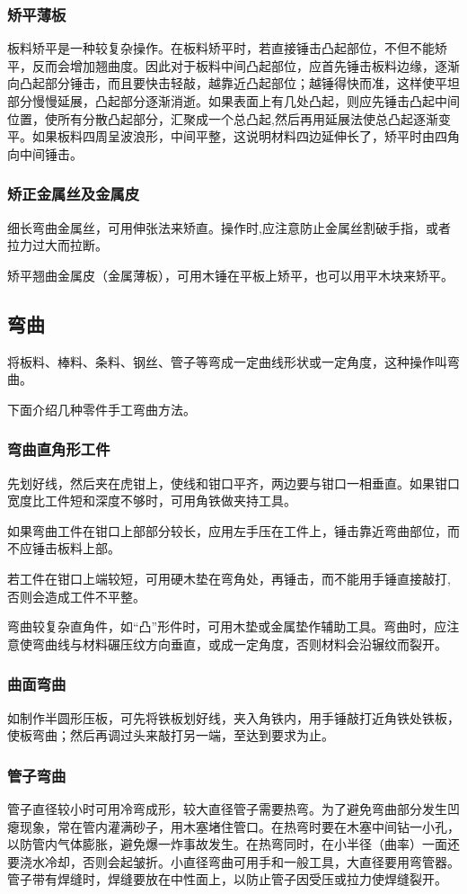 \documentclass{ctexbook}
\begin{document}
\subsubsection{矫平薄板}
板料矫平是一种较复杂操作。在板料矫平时，若直接锤击凸起部位，不但不能矫平，反而会增加翘曲度。因此对于板料中间凸起部位，应首先锤击板料边缘，逐渐向凸起部分锤击，而且要快击轻敲，越靠近凸起部位；越锤得快而准，这样使平坦部分慢慢延展，凸起部分逐渐消逝。如果表面上有几处凸起，则应先锤击凸起中间位置，使所有分散凸起部分，汇聚成一个总凸起,然后再用延展法使总凸起逐渐变平。如果板料四周呈波浪形，中间平整，这说明材料四边延伸长了，矫平时由四角向中间锤击。
\subsubsection{矫正金属丝及金属皮}
细长弯曲金属丝，可用伸张法来矫直。操作时,应注意防止金属丝割破手指，或者拉力过大而拉断。

矫平翘曲金属皮（金属薄板），可用木锤在平板上矫平，也可以用平木块来矫平。
\subsection{弯曲}
将板料、棒料、条料、钢丝、管子等弯成一定曲线形状或一定角度，这种操作叫弯曲。

下面介绍几种零件手工弯曲方法。
\subsubsection{弯曲直角形工件}
先划好线，然后夹在虎钳上，使线和钳口平齐，两边要与钳口一相垂直。如果钳口宽度比工件短和深度不够时，可用角铁做夹持工具。

如果弯曲工件在钳口上部部分较长，应用左手压在工件上，锤击靠近弯曲部位，而不应锤击板料上部。

若工件在钳口上端较短，可用硬木垫在弯角处，再锤击，而不能用手锤直接敲打,否则会造成工件不平整。

弯曲较复杂直角件，如“凸”形件时，可用木垫或金属垫作辅助工具。弯曲时，应注意使弯曲线与材料碾压纹方向垂直，或成一定角度，否则材料会沿辗纹而裂开。
\subsubsection{曲面弯曲}
如制作半圆形压板，可先将铁板划好线，夹入角铁内，用手锤敲打近角铁处铁板，使板弯曲；然后再调过头来敲打另一端，至达到要求为止。
\subsubsection{管子弯曲}
管子直径较小时可用冷弯成形，较大直径管子需要热弯。为了避免弯曲部分发生凹瘪现象，常在管内灌满砂子，用木塞堵住管口。在热弯时要在木塞中间钻一小孔，以防管内气体膨胀，避免爆一炸事故发生。在热弯同时，在小半径（曲率）一面还要浇水冷却，否则会起皱折。小直径弯曲可用手和一般工具，大直径要用弯管器。管子带有焊缝时，焊缝要放在中性面上，以防止管子因受压或拉力使焊缝裂开。
\end{document}
